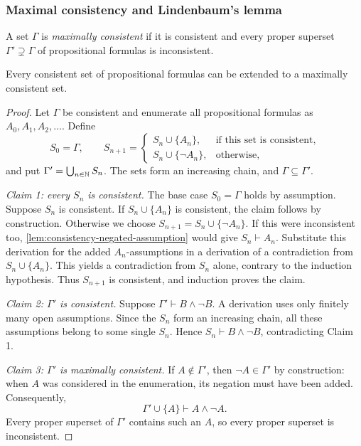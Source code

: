 \documentclass[11pt,a4paper]{amsart}
\begin{document}
\subsubsection{Maximal consistency and Lindenbaum's lemma}

\begin{definition}
  A set \(\Gamma\) is \emph{maximally consistent} if it is consistent
  and every proper superset \(\Gamma'\supsetneq\Gamma\) of propositional
  formulas is inconsistent.
\end{definition}

\begin{lemma}
  Every consistent set of propositional formulas can be extended to a
  maximally consistent set.
\end{lemma}

\begin{proof}
  Let \(\Gamma\) be consistent and enumerate all propositional formulas
  as \(A_0,A_1,A_2,\ldots\). Define
  \[
    S_0=\Gamma,\qquad
    S_{n+1}=
    \begin{cases}
      S_n\cup\{A_n\}, & \text{if this set is consistent},\\
      S_n\cup\{\neg A_n\}, & \text{otherwise},
    \end{cases}
  \]
  and put \(\Gamma'=\bigcup_{n\in\mathbb{N}}S_n\). The sets form an increasing
  chain, and \(\Gamma\subseteq\Gamma'\).

  \emph{Claim 1: every \(S_n\) is consistent.}
  The base case \(S_0=\Gamma\) holds by assumption. Suppose \(S_n\)
  is consistent. If \(S_n\cup\{A_n\}\) is consistent, the claim follows
  by construction. Otherwise we choose
  \(S_{n+1}=S_n\cup\{\neg A_n\}\).
  If this were inconsistent too,
  \cref{lem:consistency-negated-assumption} would give \(S_n\vdash A_n\).
  Substitute this derivation for the added \(A_n\)-assumptions in a
  derivation of a contradiction from \(S_n\cup\{A_n\}\). This yields a
  contradiction from \(S_n\) alone, contrary to the induction hypothesis.
  Thus \(S_{n+1}\) is consistent, and induction proves the claim.

  \emph{Claim 2: \(\Gamma'\) is consistent.}
  Suppose \(\Gamma'\vdash B\land\neg B\). A derivation uses only
  finitely many open assumptions. Since the \(S_n\) form an increasing
  chain, all these assumptions belong to some single \(S_n\). Hence
  \(S_n\vdash B\land\neg B\), contradicting Claim 1.

  \emph{Claim 3: \(\Gamma'\) is maximally consistent.}
  If \(A\notin\Gamma'\), then \(\neg A\in\Gamma'\) by construction:
  when \(A\) was considered in the enumeration, its negation must have
  been added. Consequently,
  \[
    \Gamma'\cup\{A\}\vdash A\land\neg A.
  \]
  Every proper superset of \(\Gamma'\) contains such an \(A\), so every
  proper superset is inconsistent.
\end{proof}
\end{document}

